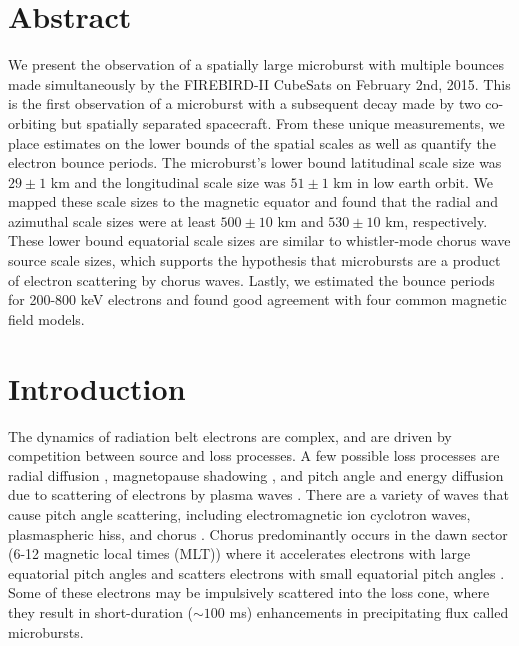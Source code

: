 \section{Abstract}
We present the observation of a spatially large microburst with multiple bounces made simultaneously by the FIREBIRD-II CubeSats on February 2nd, 2015. This is the first observation of a microburst with a subsequent decay made by two co-orbiting but spatially separated spacecraft. From these unique measurements, we place estimates on the lower bounds of the spatial scales as well as quantify the electron bounce periods. The microburst's lower bound latitudinal scale size was $29 \pm 1$ km and the longitudinal scale size was $51 \pm 1$  km in low earth orbit. We mapped these scale sizes to the magnetic equator and found that the radial and azimuthal scale sizes were at least $500 \pm​ 10$ km and $530 \pm 10$ km, respectively. These lower bound equatorial scale sizes are similar to whistler-mode chorus wave source scale sizes, which supports the hypothesis that microbursts are a product of electron scattering by chorus waves. Lastly, we estimated the bounce periods for 200-800 keV electrons and found good agreement with four common magnetic field models.

%
%
\section{Introduction}\label{Intro}
The dynamics of radiation belt electrons are complex, and are driven by competition between source and loss processes. A few possible loss processes are radial diffusion \citep{Shprits2004}, magnetopause shadowing \citep{Ukhorskiy2006}, and pitch angle and energy diffusion due to scattering of electrons by plasma waves \citep[e.g.][]{Abel1998_1, Summers1998, Meredith2002, Selesnick2003, Horne2003, Thorne2005, Mozer2018}. There are a variety of waves that cause pitch angle scattering, including electromagnetic ion cyclotron waves, plasmaspheric hiss, and chorus \citep{Millan2007, Thorne2010}. Chorus predominantly occurs in the dawn sector (6-12 magnetic local times (MLT)) \citep{Li2009} where it accelerates electrons with large equatorial pitch angles and scatters electrons with small equatorial pitch angles \citep{Horne2003}. Some of these electrons may be impulsively scattered into the loss cone, where they result in short-duration ($\sim 100$ ms) enhancements in precipitating flux called microbursts.

